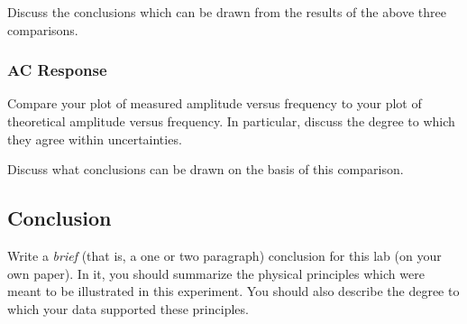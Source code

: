 \noindent 
Discuss the conclusions which can be drawn from the results of the above three
comparisons.
\newpage 

\subsubsection{AC Response}  

Compare your plot of measured amplitude versus frequency to your plot of theoretical
amplitude versus frequency. In particular, discuss the degree to which they agree
within uncertainties.
\vspace*{2cm}

\noindent
Discuss what conclusions can be drawn on the basis of this comparison.
\vspace*{3.5cm}

\subsection{Conclusion}

Write a {\it brief} (that is, a one or two paragraph) conclusion for this lab (on your
own paper). In it, you should summarize the physical principles which were meant to be
illustrated in this experiment. You should also describe the degree to which your data
supported these principles.


\renewcommand{\thesection}{\thechapter.\arabic{section}}



